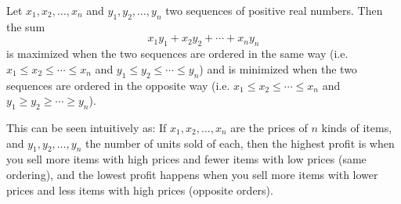 \documentclass{article}
\begin{document}
Let $x_1,x_2,\ldots,x_n$ and $y_1,y_2,\ldots,y_n$ two sequences of positive real numbers.
Then the sum
$$x_1y_1+x_2y_2+\cdots+x_ny_n$$
is maximized when the two sequences are ordered in the same way (i.e. $x_1\le x_2\le \cdots \le x_n$ and $y_1\le y_2\le\cdots\le y_n$) and is minimized when the two sequences are ordered in the opposite way (i.e. $x_1\le x_2\le \cdots \le x_n$ and $y_1\ge y_2\ge\cdots\ge y_n$).
\bigskip

This can be seen intuitively as:
If $x_1,x_2,\ldots,x_n$ are the prices of $n$ kinds of items, and $y_1,y_2,\ldots,y_n$ the number of units sold of each, then the highest profit is when you sell more items with high prices and fewer items with low prices (same ordering), and the lowest profit happens when you sell more items with lower prices and less items with high prices (opposite orders).
\end{document}
